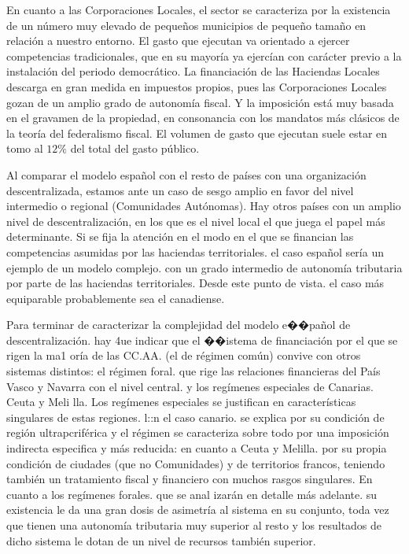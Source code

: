 \documentclass[10pt,a4paper]{article}
\begin{document}
En cuanto a las Corporaciones Locales, el sector se caracteriza por la existencia de un número muy elevado de pequeños municipios de pequeño tamaño en relación a nuestro entorno. El gasto que ejecutan va orientado a ejercer competencias tradicionales, que en su mayoría ya ejercían con carácter previo a la instalación del periodo democrático. La financiación de las Haciendas Locales descarga en gran medida en impuestos propios, pues las Corporaciones Locales gozan de un amplio grado de autonomía fiscal. Y la imposición está muy basada en el gravamen de la propiedad, en consonancia con los mandatos más clásicos de la teoría del federalismo fiscal. El volumen de gasto que ejecutan suele estar en tomo al $12\%$ del total del  gasto público.

Al comparar el modelo español con el resto de países con una organización descentralizada, estamos ante un caso de sesgo amplio en favor del nivel intermedio o regional (Comunidades Autónomas). Hay otros países con un amplio nivel de descentralización, en los que es el nivel local el que juega el papel más determinante. Si se fija la atención en el modo en el que se financian las competencias asumidas por las haciendas territoriales. el caso español sería un ejemplo de un modelo complejo. con un grado intermedio de autonomía tributaria por parte de las haciendas territoriales. Desde este punto de vista. el caso más equiparable probablemente sea el canadiense.

Para terminar de caracterizar la complejidad del modelo e��pañol de descentralización. hay 4ue indicar que el ��istema de financiación por el que se rigen la ma1 oría de las CC.AA. (el de régimen común) convive con otros sistemas distintos: el régimen foral. que rige las relaciones financieras del País Vasco y Navarra con el nivel central. y los regímenes especiales de Canarias. Ceuta y Meli lla. Los regímenes especiales se justifican en características singulares de estas regiones. l::n el caso canario. se explica por su condición de región ultrapcriférica y el régimen se caracteriza sobre todo por una imposición indirecta especifica y más reducida: en cuanto a Ceuta y Melilla. por su propia condición de ciudades (que no Comunidades) y de territorios francos, teniendo también un tratamiento fiscal y financiero con muchos rasgos singulares. En cuanto a los regímenes forales. que se anal izarán en detalle más adelante. su existencia le da una gran dosis de asimetría al sistema en su conjunto, toda vez que tienen una autonomía tributaria muy superior al resto y los resultados de dicho sistema le dotan de un nivel de recursos también superior.
\end{document}
